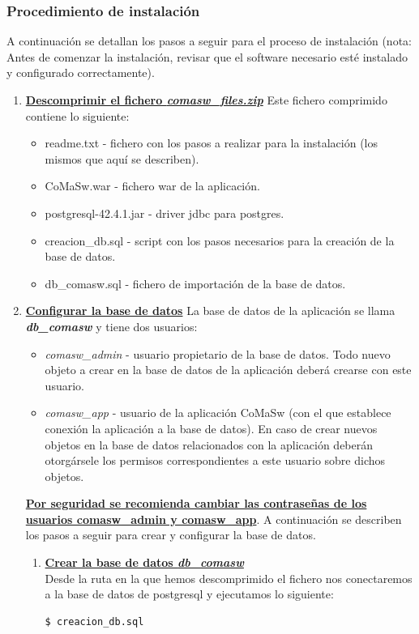 \subsubsection{Procedimiento de instalación}
\label{sub:proceso-instalacion}
A continuación se detallan los pasos a seguir para el proceso de instalación (nota: Antes de comenzar la instalación, revisar que el software necesario esté instalado y configurado correctamente).
\begin{enumerate}
\item \underline{\textbf{Descomprimir el fichero \emph{comasw\_files.zip}}} \newline
Este fichero comprimido contiene lo siguiente:
	\begin{itemize}
	    \item readme.txt - fichero con los pasos a realizar para la instalación (los mismos que aquí se describen).
		\item CoMaSw.war - fichero war de la aplicación.
		\item postgresql-42.4.1.jar - driver jdbc para postgres.
		\item creacion\_db.sql - script con los pasos necesarios para la creación de la base de datos.
		\item db\_comasw.sql - fichero de importación de la base de datos.
	\end{itemize}

\item \underline{\textbf{Configurar la base de datos}}\newline
La base de datos de la aplicación se llama \emph{\textbf{db\_comasw}} y tiene dos usuarios:
	\begin{itemize}
		\item \emph{comasw\_admin} - usuario propietario de la base de datos. Todo nuevo objeto a crear en la base de datos de la aplicación deberá crearse con este usuario.
		\item \emph{comasw\_app} - usuario de la aplicación CoMaSw (con el que establece conexión la aplicación a la base de datos). En caso de crear nuevos objetos en la base de datos relacionados con la aplicación deberán otorgársele los permisos correspondientes a este usuario sobre dichos objetos.
	\end{itemize}
\underline{\textbf{Por seguridad se recomienda cambiar las contraseñas de los usuarios comasw\_admin y comasw\_app}}.
A continuación se describen los pasos a seguir para crear y configurar la base de datos.	
	\begin{enumerate}
		\item \underline{\textbf{Crear la base de datos \emph{\textbf{db\_comasw}}}}\\
Desde la ruta en la que hemos descomprimido el fichero nos conectaremos a la base de datos de postgresql y ejecutamos lo siguiente:
\begin{lstlisting}[style=comando]
  $ creacion_db.sql
\end{lstlisting}


\end{enumerate}
\end{enumerate}
